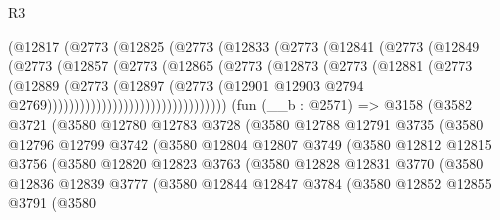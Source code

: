 \begin{lexlean}{R3}
\begin{coremodule}
                        (@12817
                          (@2773
                            (@12825
                              (@2773
                                (@12833
                                  (@2773
                                    (@12841
                                      (@2773
                                        (@12849
                                          (@2773
                                            (@12857
                                              (@2773
                                                (@12865
                                                  (@2773
                                                    (@12873
                                                      (@2773
                                                        (@12881
                                                          (@2773
                                                            (@12889
                                                              (@2773
                                                                (@12897
                                                                  (@2773
                                                                    (@12901
                                                                      @12903
                                                                      @2794
                                                                      @2769)))))))))))))))))))))))))))))))))
    (fun (__b : @2571) =>
    @3158
      (@3582
        @3721
        (@3580
          @12780
          @12783
          @3728
          (@3580
            @12788
            @12791
            @3735
            (@3580
              @12796
              @12799
              @3742
              (@3580
                @12804
                @12807
                @3749
                (@3580
                  @12812
                  @12815
                  @3756
                  (@3580
                    @12820
                    @12823
                    @3763
                    (@3580
                      @12828
                      @12831
                      @3770
                      (@3580
                        @12836
                        @12839
                        @3777
                        (@3580
                          @12844
                          @12847
                          @3784
                          (@3580
                            @12852
                            @12855
                            @3791
                            (@3580

\end{coremodule}
\end{lexlean}

